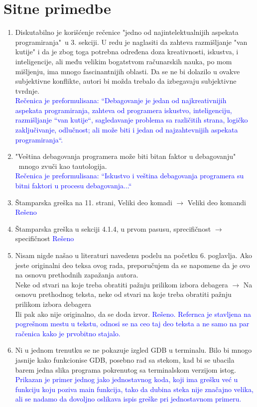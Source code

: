 \documentclass[a4paper]{report}
\newcommand{\odgovor}[1]{\textcolor{blue}{#1}}
\begin{document}
\section{Sitne primedbe}
\begin{enumerate}
		
	\item Diskutabilno je korišćenje rečenice "jedno od najintelektualnijih aspekata programiranja"\ u 3. sekciji. U redu je naglasiti da zahteva razmišljanje "van kutije" i da je zbog toga potrebna određena doza kreativnosti, iskustva, i inteligencije, ali među velikim bogatstvom računarskih nauka, po mom mišljenju, ima mnogo fascinantnijih oblasti. Da se ne bi dolazilo u ovakve subjektivne konflikte, autori bi možda trebalo da izbegavaju subjektivne tvrdnje. \\
	\odgovor{Rečenica je preformulisana: ``Debagovanje je jedan od najkreativnijih aspekata programiranja, zahteva od programera iskustvo,
inteligenciju, razmišljanje ``van kutije``, sagledavanje problema sa različitih strana, logičko zaključivanje, odlučnost;  
ali može biti i jedan od najzahtevnijih aspekata programiranja``.}
	\item "Veština debagovanja programera može biti bitan faktor u debagovanju" \ mnogo zvuči kao tautologija. \\
	\odgovor{Rečenica je preformulisana: ``Iskustvo i veština debagovanja programera su bitni faktori u procesu debagovanja...``}
	\item Štamparska greška na 11. strani, Veliki deo komadi $\rightarrow$ Veliki deo komandi
	\odgovor{Rešeno}
	\item Štamparska greška u sekciji 4.1.4, u prvom pasusu,  sprecifičnost $\rightarrow$ specifičnost
	\odgovor{Rešeno}
	\item Nisam nigde našao u literaturi navedenu podelu na početku 6. poglavlja. Ako jeste originalni deo teksa ovog rada, preporučujem da se napomene da je ovo na osnovu prethodnih zapažanja autora.
\\
 Neke od stvari na koje treba obratiti pažnju prilikom izbora debagera  $\rightarrow$  Na osnovu prethodnog teksta, neke od stvari na koje treba obratiti pažnju prilikom izbora debagera
\\
Ili pak ako nije originalno, da se doda izvor. 
\odgovor{Rešeno. Refernca je stavljena na pogrešnom mestu u tekstu, odnosi se na ceo taj deo teksta a ne samo na par račenica kako je prvobitno stajalo.}
\item Ni u jednom trenutku se ne pokazuje izgled GDB u terminalu. Bilo bi mnogo jasnije kako funkcionise GDB, posebno rad sa stekom, kad bi se ubacila barem 
jedna slika programa pokrenutog sa terminalskom verzijom istog.\\
 	\odgovor{Prikazan je primer jednog jako jednostavnog koda, koji ima grešku već u funkciju koju poziva main funkcija, tako da
 	dubina steka nije značajno velika, ali se nadamo da dovoljno oslikava ispis greške pri jednostavnom primeru.}
\end{enumerate}
\end{document}
